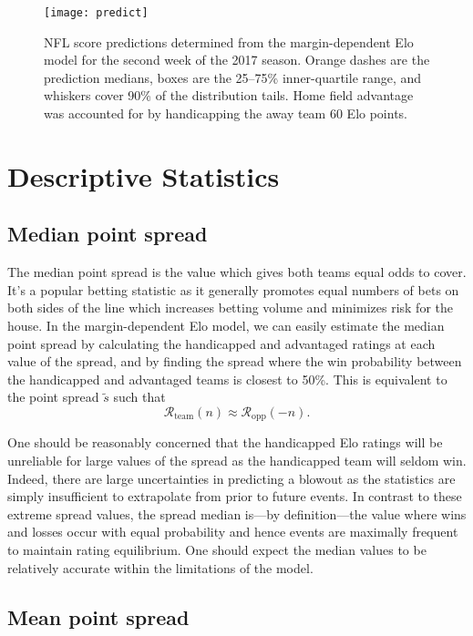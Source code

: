\documentclass[aps,prc,reprint,amsmath,superscriptaddress]{revtex4-1}
\newcommand{\R}{\mathcal{R}}
\begin{document}
\begin{figure}
  \texttt{[image: predict]}
  \caption{NFL score predictions determined from the margin-dependent Elo model for the second week of the 2017 season. Orange dashes are the prediction medians, boxes are the 25--75\% inner-quartile range, and whiskers cover 90\% of the distribution tails. Home field advantage was accounted for by handicapping the away team 60 Elo points.}
\end{figure}

\section{Descriptive Statistics}

\subsection{Median point spread}

The median point spread is the value which gives both teams equal odds to cover.
It's a popular betting statistic as it generally promotes equal numbers of bets on both sides of the line which increases betting volume and minimizes risk for the house.
In the margin-dependent Elo model, we can easily estimate the median point spread by calculating the handicapped and advantaged ratings at each value of the spread, and by finding the spread where the win probability between the handicapped and advantaged teams is closest to 50\%.
This is equivalent to the point spread $\tilde{s}$ such that
\begin{equation}
  \R_\text{team}(n) \approx \R_\text{opp}(-n).
\end{equation}

One should be reasonably concerned that the handicapped Elo ratings will be unreliable for large values of the spread as the handicapped team will seldom win.
Indeed, there are large uncertainties in predicting a blowout as the statistics are simply insufficient to extrapolate from prior to future events.
In contrast to these extreme spread values, the spread median is---by definition---the value where wins and losses occur with equal probability and hence events are maximally frequent to maintain rating equilibrium.
One should expect the median values to be relatively accurate within the limitations of the model.

\subsection{Mean point spread}
\end{document}
